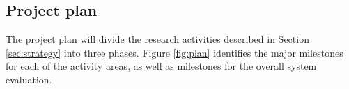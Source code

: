\subsection{Project plan}

The project plan will divide the research activities described in Section
\ref{sec:strategy} into three phases. Figure \ref{fig:plan} identifies the major
milestones for each of the activity areas, as well as milestones for the overall
system evaluation.









